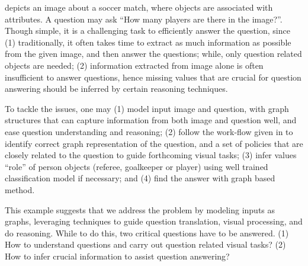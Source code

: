 
\begin{example}
 depicts an image about a soccer match, where  objects are associated with attributes. A question may ask ``How many players are there in the image?''. Though simple, it is a challenging task to efficiently answer the question, since (1) traditionally, it often takes time to extract as much information as possible from the given image, and then answer the questions; while, only question related objects are needed; (2) information extracted from image alone is often insufficient to answer questions, hence missing values that are crucial for question answering should be inferred by certain reasoning techniques. 

To tackle the issues, one may (1) model input \ie image and question, with graph structures that can capture information from both image and question well, and ease question understanding and reasoning; (2) follow the work-flow given in  to identify correct graph representation of the question, and a set of policies that are closely related to the question to guide forthcoming visual tasks; (3) infer values \eg ``role'' of person objects (referee, goalkeeper or player) using well trained classification model if necessary; and (4) find the answer with graph based method. 
\end{example}

This example suggests that we address the \vqa problem by modeling inputs as graphs, leveraging techniques to guide question translation, visual processing, and do reasoning. While to do this, two critical questions have to be answered. (1) How to understand questions and carry out question related visual tasks? (2) How to infer crucial information to assist question answering?  


